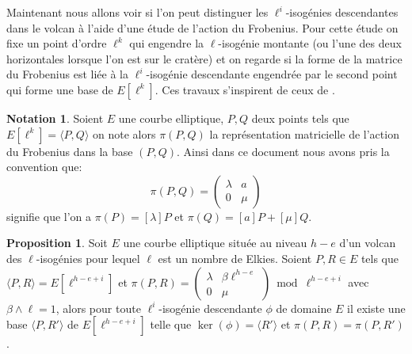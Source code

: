 \documentclass[10pt,a4paper]{book}
\theoremstyle{plain}
\theoremstyle{definition}
\theoremstyle{definition}
\theoremstyle{definition}
\theoremstyle{definition}
\newtheorem{prop}[thm]{Proposition}
\theoremstyle{definition}
\theoremstyle{remark}
\theoremstyle{remark}
\theoremstyle{definition}
\newtheorem{nota}[thm]{Notation}
\begin{document}
Maintenant nous allons voir si l'on peut distinguer les 
$\ell^i$-isogénies descendantes dans le volcan à l'aide d'une étude de l'action
du Frobenius. Pour cette étude on fixe un point d'ordre $\ell^k$ qui engendre 
la $\ell$-isogénie montante (ou l'une des deux horizontales lorsque l'on est 
sur le cratère) et on regarde si la forme de la matrice du Frobenius est liée à
la $\ell^i$-isogénie descendante engendrée par le second point qui forme une 
base de $E[\ell^k]$.  Ces travaux s'inspirent de ceux de \cite[Chapitre 6]{Master13}.


\begin{nota} 
Soient $E$ une courbe elliptique, $P,Q$ deux points tels que $E[\ell^k]=\langle
P,Q \rangle$ on note alors $\pi(P,Q)$ la représentation matricielle de l'action
du Frobenius dans la base $(P,Q)$. Ainsi dans ce document nous avons pris la 
convention que:
\[
\pi(P,Q)=\left(
\begin{matrix}
\lambda & a \\
0 & \mu
\end{matrix}
 \right)
\]
signifie que l'on a $\pi(P)=[\lambda]P$ et $\pi(Q)=[a]P+[\mu]Q$.
\end{nota}

\begin{prop}
\label{pro:etu:atk:elk}
Soit $E$ une courbe elliptique située au niveau $h-e$ d'un volcan des 
$\ell$-isogénies pour lequel $\ell$ est un nombre de Elkies. Soient $P,R 
\in E$ tels que $\langle P,R \rangle =E[\ell^{h-e+i}]$ et $\pi(P,R)= 
\left( \begin{matrix}\lambda & \beta 
\ell^{h-e} \\0 & \mu \end{matrix}\right) \bmod \ell^{h-e+i}$ avec $\beta \wedge
\ell=1$, alors pour toute $\ell^i$-isogénie descendante $\phi$ de domaine $E$ il
existe une base $\langle P,R' \rangle$ de $E[\ell^{h-e+i}]$ telle que  $\ker(\phi)=\langle R' \rangle$ et $\pi(P,R)=\pi(P,R')$.
\end{prop}
\end{document}
